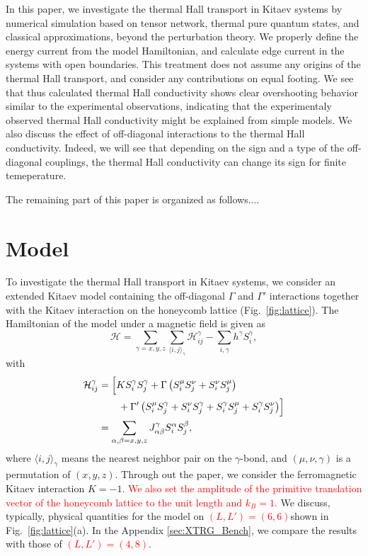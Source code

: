 \documentclass[reprint,amsmath,amssymb,aps,prx]{revtex4-2}
\newcommand{\red}[1]{\textcolor{red}{#1}}
\begin{document}
In this paper, we investigate the thermal Hall transport in Kitaev systems by numerical simulation based on tensor network, thermal pure quantum states, and classical approximations, beyond the perturbation theory. We properly define the energy current from the model Hamiltonian, and calculate edge current in the systems with open boundaries. This treatment does not assume any origins of the thermal Hall transport, and consider any contributions on equal footing.  We see that thus calculated thermal Hall conductivity shows clear overshooting behavior similar to the experimental observations, indicating that the experimentaly observed thermal Hall conductivity might be explained from simple models. We also discuss the effect of off-diagonal interactions to the thermal Hall conductivity. Indeed, we will see that depending on the sign and a type of the off-diagonal couplings, the thermal Hall conductivity can change its sign for finite temeperature. 

The remaining part of this paper is organized as follows....


\section{Model}
To investigate the thermal Hall transport in Kitaev systems, we consider an extended Kitaev model containing the off-diagonal $\Gamma$ and $\Gamma'$ interactions together with the Kitaev interaction on the honeycomb lattice (Fig.~\ref{fig:lattice}). The Hamiltonian of the model under a magnetic field is given as 
\begin{equation}
 \mathcal{H} = \sum_{\gamma = x,y,z} \sum_{\langle i,j \rangle_\gamma}\mathcal{H}_{ij}^\gamma -  \sum_{i,\gamma} h^\gamma S_i^\gamma,
 \label{eq:model-Hamiltonian}
\end{equation}
with
\begin{align}
 \mathcal{H}_{ij}^\gamma &= \Bigl[ K S_i^\gamma S_j^\gamma + \Gamma\left( S_i^\mu S_j^\nu + S_i^\nu S_j^\mu \right) \notag\\
&\qquad + \Gamma'\left( S_i^\mu S_j^\gamma + S_i^\nu S_j^\gamma + S_i^\gamma S_j^\mu + S_i^\gamma S_j^\nu \right) \Bigr]\\
&= \sum_{\alpha,\beta = x,y,z} J_{\alpha\beta}^\gamma S_i^\alpha S_j^\beta, 
\end{align}
where $\langle i,j\rangle_\gamma$ means the nearest neighbor pair on the $\gamma$-bond, and $(\mu, \nu, \gamma)$ is a permutation of $(x,y,z)$. Through out the paper, we consider the ferromagnetic Kitaev interaction $K= -1$. \red{We also set the amplitude of the primitive translation vector of the honeycomb lattice to the unit length and $k_B = 1$.} We discuss, typically, physical quantities for the model on \red{$(L, L') = (6, 6)$}shown in Fig.~\ref{fig:lattice}(a). In the Appendix \ref{sec:XTRG_Bench}, we compare the results with those of \red{$(L, L') = (4, 8)$}. 
\end{document}
